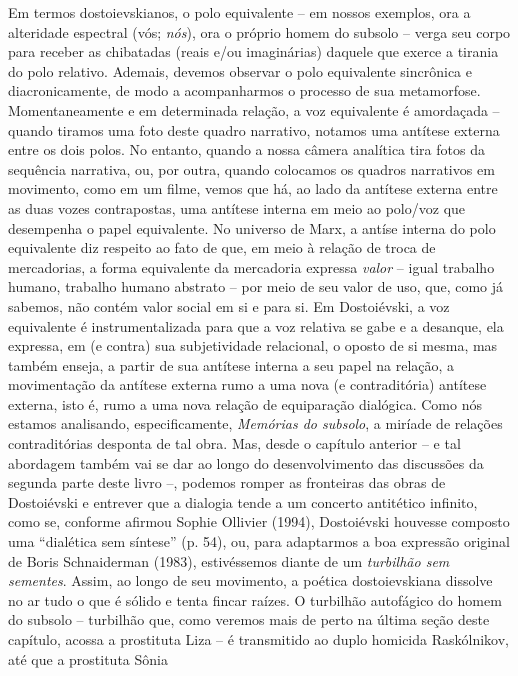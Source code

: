 Em termos dostoievskianos, o polo equivalente -- em nossos exemplos, ora
a alteridade espectral (vós; \emph{nós}), ora o próprio homem do subsolo
-- verga seu corpo para receber as chibatadas (reais e/ou imaginárias)
daquele que exerce a tirania do polo relativo. Ademais, devemos observar
o polo equivalente sincrônica e diacronicamente, de modo a acompanharmos
o processo de sua metamorfose. Momentaneamente e em determinada relação,
a voz equivalente é amordaçada -- quando tiramos uma foto deste quadro
narrativo, notamos uma antítese externa entre os dois polos. No entanto,
quando a nossa câmera analítica tira fotos da sequência narrativa, ou,
por outra, quando colocamos os quadros narrativos em movimento, como em
um filme, vemos que há, ao lado da antítese externa entre as duas vozes
contrapostas, uma antítese interna em meio ao polo/voz que desempenha o
papel equivalente. No universo de Marx, a antíse interna do polo
equivalente diz respeito ao fato de que, em meio à relação de troca de
mercadorias, a forma equivalente da mercadoria expressa \emph{valor} --
igual trabalho humano, trabalho humano abstrato -- por meio de seu valor
de uso, que, como já sabemos, não contém valor social em si e para si.
Em Dostoiévski, a voz equivalente é instrumentalizada para que a voz
relativa se gabe e a desanque, ela expressa, em (e contra) sua
subjetividade relacional, o oposto de si mesma, mas também enseja, a
partir de sua antítese interna a seu papel na relação, a movimentação da
antítese externa rumo a uma nova (e contraditória) antítese externa,
isto é, rumo a uma nova relação de equiparação dialógica. Como nós
estamos analisando, especificamente, \emph{Memórias do subsolo}, a
miríade de relações contraditórias desponta de tal obra. Mas, desde o
capítulo anterior -- e tal abordagem também vai se dar ao longo do
desenvolvimento das discussões da segunda parte deste livro --, podemos
romper as fronteiras das obras de Dostoiévski e entrever que a dialogia
tende a um concerto antitético infinito, como se, conforme afirmou
Sophie Ollivier (1994), Dostoiévski houvesse composto uma ``dialética
sem síntese'' (p. 54), ou, para adaptarmos a boa expressão original de
Boris Schnaiderman (1983), estivéssemos diante de um \emph{turbilhão sem
sementes}. Assim, ao longo de seu movimento, a poética dostoievskiana
dissolve no ar tudo o que é sólido e tenta fincar raízes. O turbilhão
autofágico do homem do subsolo -- turbilhão que, como veremos mais de
perto na última seção deste capítulo, acossa a prostituta Liza -- é
transmitido ao duplo homicida Raskólnikov, até que a prostituta Sônia
